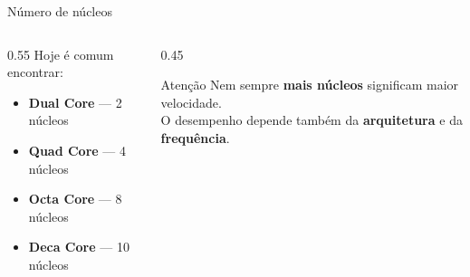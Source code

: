 \documentclass[aspectratio=169]{beamer}
\begin{document}
\begin{frame}{Número de núcleos}
    \begin{columns}[T]
        \begin{column}{0.55\textwidth}
            Hoje é comum encontrar:
            \vspace{0.5em}
            \begin{itemize}
                \item \textbf{Dual Core} — 2 núcleos
                \item \textbf{Quad Core} — 4 núcleos
                \item \textbf{Octa Core} — 8 núcleos
                \item \textbf{Deca Core} — 10 núcleos
            \end{itemize}
        \end{column}
        \begin{column}{0.45\textwidth}
            \begin{alertblock}{Atenção}
                Nem sempre \textbf{mais núcleos} significam maior velocidade.\\[0.4em]
                O desempenho depende também da \textbf{arquitetura} e da \textbf{frequência}.
            \end{alertblock}
        \end{column}
    \end{columns}
\end{frame}
\end{document}
